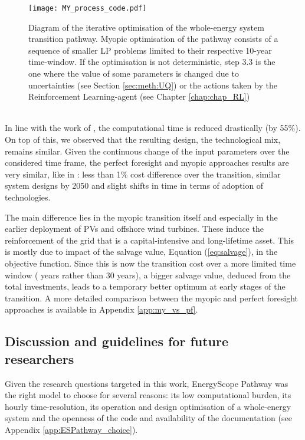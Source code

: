 \begin{figure}[htbp!]
\centering
\texttt{[image: MY\_process\_code.pdf]}
\caption{Diagram of the iterative optimisation of the whole-energy system transition pathway. Myopic optimisation of the pathway consists of a sequence of smaller \gls{LP} problems limited to their respective 10-year time-window. If the optimisation is not deterministic, step 3.3 is the one where the value of some parameters is changed due to uncertainties (see Section \ref{sec:meth:UQ}) or the actions taken by the Reinforcement Learning-agent (see Chapter \ref{chap:chap_RL})}
\label{fig:MY_process_code}
\end{figure}

\\

\noindent
In line with the work of \citet{babrowski2014reducing}, the computational time is reduced drastically (\ie by 55\%). On top of this, we observed that the resulting design, \ie the technological mix, remains similar.  Given the continuous change of the input parameters over the considered time frame, the perfect foresight and myopic approaches results are very similar, like in \cite{krey2006vergleich}: less than 1\% cost difference over the transition, similar system designs by 2050 and slight shifts in time in terms of adoption of technologies. 

The main difference lies in the myopic transition itself and especially in the earlier deployment of PVs and offshore wind turbines. These induce the reinforcement of the grid that is a capital-intensive and long-lifetime asset. This is mostly due to impact of the salvage value, Equation (\ref{eq:salvage}), in the objective function. Since this is now the transition cost over a more limited time window ( years rather than 30 years), a bigger salvage value, deduced from the total investments, leads to a temporary better optimum at early stages of the transition. A more detailed comparison between the myopic and perfect foresight approaches is available in Appendix \ref{app:my_vs_pf}.

\subsection{Discussion and guidelines for future researchers}
\label{subsec:meth:ES:discussion}
Given the research questions targeted in this work, EnergyScope Pathway was the right model to choose for several reasons: its low computational burden, its hourly time-resolution, its operation and design optimisation of a whole-energy system and the openness of the code and availability of the documentation (see Appendix \ref{app:ESPathway_choice}). 


